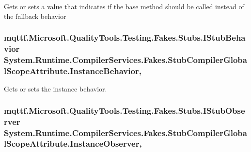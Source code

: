 Gets or sets a value that indicates if the base method should be called instead of the fallback behavior

\hypertarget{class_system_1_1_runtime_1_1_compiler_services_1_1_fakes_1_1_stub_compiler_global_scope_attribute_ae4812b470bff9f23b43bcec4f8685da6}{
\subsubsection[{Instance\-Behavior}]{\setlength{\rightskip}{0pt plus 5cm}mqttf.\-Microsoft.\-Quality\-Tools.\-Testing.\-Fakes.\-Stubs.\-I\-Stub\-Behavior System.\-Runtime.\-Compiler\-Services.\-Fakes.\-Stub\-Compiler\-Global\-Scope\-Attribute.\-Instance\-Behavior\hspace{0.3cm}{\ttfamily [get]}, {\ttfamily [set]}}}\label{class_system_1_1_runtime_1_1_compiler_services_1_1_fakes_1_1_stub_compiler_global_scope_attribute_ae4812b470bff9f23b43bcec4f8685da6}


Gets or sets the instance behavior.

\hypertarget{class_system_1_1_runtime_1_1_compiler_services_1_1_fakes_1_1_stub_compiler_global_scope_attribute_a68960cc7c2e35cc204421ef956b86ce5}{
\subsubsection[{Instance\-Observer}]{\setlength{\rightskip}{0pt plus 5cm}mqttf.\-Microsoft.\-Quality\-Tools.\-Testing.\-Fakes.\-Stubs.\-I\-Stub\-Observer System.\-Runtime.\-Compiler\-Services.\-Fakes.\-Stub\-Compiler\-Global\-Scope\-Attribute.\-Instance\-Observer\hspace{0.3cm}{\ttfamily [get]}, {\ttfamily [set]}}}\label{class_system_1_1_runtime_1_1_compiler_services_1_1_fakes_1_1_stub_compiler_global_scope_attribute_a68960cc7c2e35cc204421ef956b86ce5}


